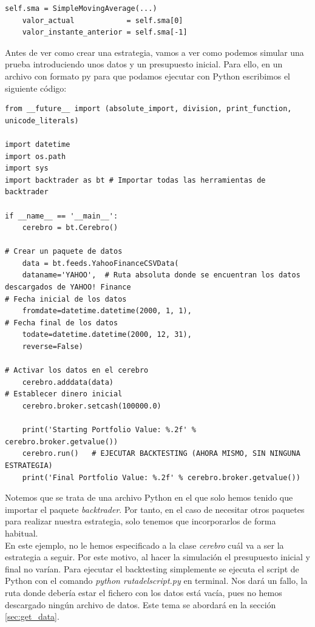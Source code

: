 \documentclass[12pt,a4paper]{article}
\begin{document}
		\begin{lstlisting}[basicstyle=\tiny]
	self.sma = SimpleMovingAverage(...)
	valor_actual            = self.sma[0]
	valor_instante_anterior = self.sma[-1]
		\end{lstlisting}
		
		\vspace{0.8cm}
		
		Antes de ver como crear una estrategia, vamos a ver como podemos simular una prueba introduciendo unos datos y un presupuesto inicial. Para ello, en un archivo con formato py para que podamos ejecutar con Python escribimos el siguiente c\'odigo:
		
		\begin{lstlisting}[basicstyle=\tiny]
from __future__ import (absolute_import, division, print_function, unicode_literals)
		
import datetime
import os.path
import sys
import backtrader as bt # Importar todas las herramientas de backtrader
		
if __name__ == '__main__':
	cerebro = bt.Cerebro()
		
# Crear un paquete de datos
	data = bt.feeds.YahooFinanceCSVData(
	dataname='YAHOO',  # Ruta absoluta donde se encuentran los datos descargados de YAHOO! Finance
# Fecha inicial de los datos
	fromdate=datetime.datetime(2000, 1, 1),
# Fecha final de los datos
	todate=datetime.datetime(2000, 12, 31),
	reverse=False)
		
# Activar los datos en el cerebro
	cerebro.adddata(data)
# Establecer dinero inicial    
	cerebro.broker.setcash(100000.0)
		
	print('Starting Portfolio Value: %.2f' % cerebro.broker.getvalue())
	cerebro.run()   # EJECUTAR BACKTESTING (AHORA MISMO, SIN NINGUNA ESTRATEGIA)
	print('Final Portfolio Value: %.2f' % cerebro.broker.getvalue())
		\end{lstlisting}
		
		\vspace{0.5cm}
		
		Notemos que se trata de una archivo Python en el que solo hemos tenido que importar el paquete \textit{backtrader}. Por tanto, en el caso de necesitar otros paquetes para realizar nuestra estrategia, solo tenemos que incorporarlos de forma habitual.\\
		
		En este ejemplo, no le hemos especificado a la clase \textit{cerebro} cu\'al va a ser la estrategia a seguir. Por este motivo, al hacer la simulaci\'on el presupuesto inicial y final no var\'ian. Para ejecutar el backtesting simplemente se ejecuta el script de Python con el comando \textit{python rutadelscript.py} en terminal. Nos dar\'a un fallo, la ruta donde deber\'ia estar el fichero con los datos est\'a vac\'ia, pues no hemos descargado ning\'un archivo de datos. Este tema se abordar\'a en la secci\'on \ref{sec:get_data}.
		
\end{document}

